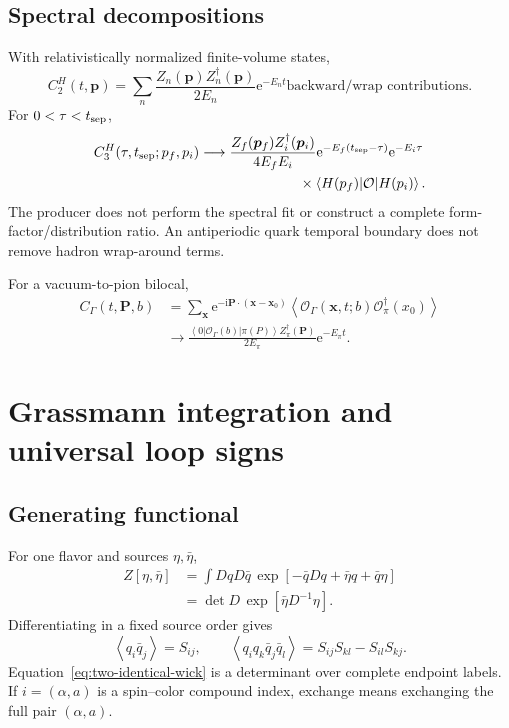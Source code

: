 \documentclass[11pt,a4paper]{article}
\numberwithin{equation}{section}
\newcommand{\ii}{\mathrm{i}}
\newcommand{\ee}{\mathrm{e}}
\newcommand{\avg}[1]{\left\langle #1\right\rangle}
\newcommand{\cO}{\mathcal{O}}
\begin{document}
\subsection{Spectral decompositions}

With relativistically normalized finite-volume states,
\begin{equation}
 C_2^H(t,\boldsymbol p)
 =\sum_n\frac{Z_n(\boldsymbol p)Z_n^\dagger(\boldsymbol p)}{2E_n}
 \ee^{-E_nt}
 \text{backward/wrap contributions}.
 \label{eq:C2-spectral}
\end{equation}
For \(0<\tau<t_{\rm sep}\),
\begin{align}
 C_3^H(\tau,t_{\rm sep};p_f,p_i)
 &\longrightarrow
 \frac{Z_f(\boldsymbol p_f)Z_i^\dagger(\boldsymbol p_i)}
      {4E_fE_i}
 \ee^{-E_f(t_{\rm sep}-\tau)}
 \ee^{-E_i\tau}
 \nonumber\\
 &\hspace{2.5cm}\times
 \avg{H(p_f)|\cO|H(p_i)}.
 \label{eq:C3-spectral}
\end{align}
The producer does not perform the spectral fit or construct a complete
form-factor/distribution ratio.  An antiperiodic quark temporal boundary does
not remove hadron wrap-around terms.

For a vacuum-to-pion bilocal,
\begin{align}
 C_\Gamma(t,\boldsymbol P,b)
 &=\sum_{\boldsymbol x}
   \ee^{-\ii\boldsymbol P\cdot(\boldsymbol x-\boldsymbol x_0)}
   \avg{\cO_\Gamma(\boldsymbol x,t;b)
        \cO_\pi^\dagger(x_0)}
 \nonumber\\
 &\longrightarrow
 \frac{\avg{0|\cO_\Gamma(b)|\pi(P)}
       Z_\pi^\dagger(\boldsymbol P)}
      {2E_\pi}
 \ee^{-E_\pi t}.
 \label{eq:vac-pion-spectral}
\end{align}

\section{Grassmann integration and universal loop signs}

\subsection{Generating functional}

For one flavor and sources \(\eta,\bar\eta\),
\begin{align}
 Z[\eta,\bar\eta]
 &=\int DqD\bar q\,
   \exp\left[-\bar qDq+\bar\eta q+\bar q\eta\right]
 \nonumber\\
 &=\det D\,\exp\left[\bar\eta D^{-1}\eta\right].
\end{align}
Differentiating in a fixed source order gives
\begin{equation}
 \avg{q_i\bar q_j}=S_{ij},\qquad
 \avg{q_iq_k\bar q_j\bar q_l}
 =S_{ij}S_{kl}-S_{il}S_{kj}.
 \label{eq:two-identical-wick}
\end{equation}
Equation~\eqref{eq:two-identical-wick} is a determinant over complete endpoint
labels.  If \(i=(\alpha,a)\) is a spin--color compound index, exchange means
exchanging the full pair \((\alpha,a)\).
\end{document}
